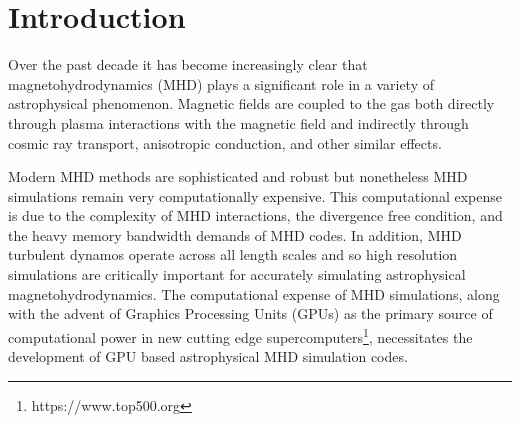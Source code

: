 \section{Introduction}
\label{sec:intro}


Over the past decade it has become increasingly clear that magnetohydrodynamics (MHD) plays a significant role in a variety of astrophysical phenomenon\citep{kobayashi_metallicity_2023, wang_three-dimensional_2023, mori_scale-dependent_2023, werhahn_gamma-ray_2023, zhang_particle_2023, varma_3d_2023, stimpson_numerical_2023, bruggen_2023, yoshida_trajectory_2021, kim_introducing_2023, jones_density_2023, lu_effect_2020,kortgen_shape_2019,galishnikova_tearing_2022, su_stellar_2018,roy_seeding_2023,fielding_how_2017}. Magnetic fields are coupled to the gas both directly through plasma interactions with the magnetic field and indirectly through cosmic ray transport\citep{werhahn_gamma-ray_2023, yoshida_trajectory_2021}, anisotropic conduction\citep{bruggen_2023}, and other similar effects. 

Modern MHD methods are sophisticated and robust but nonetheless MHD simulations remain very computationally expensive\cite{athena++_2020}. This computational expense is due to the complexity of MHD interactions, the divergence free condition, and the heavy memory bandwidth demands of MHD codes\citep{k_athena_2021}. In addition, MHD turbulent dynamos operate across all length scales and so high resolution simulations are critically important for accurately simulating astrophysical magnetohydrodynamics\citep{galishnikova_tearing_2022, pakmor_simulations_2013}. The computational expense of MHD simulations, along with the advent of Graphics Processing Units (GPUs) as the primary source of computational power in new cutting edge supercomputers\footnote{https://www.top500.org}, necessitates the development of GPU based astrophysical MHD simulation codes. 

